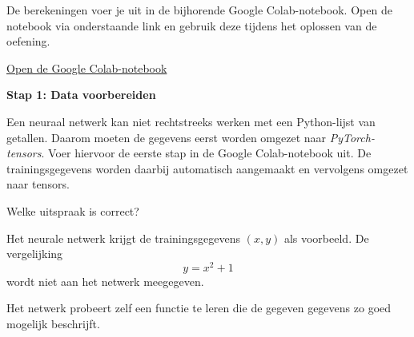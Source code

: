 \documentclass{ximera}
\begin{document}
De berekeningen voer je uit in de bijhorende Google Colab-notebook. Open de notebook via onderstaande link en gebruik deze tijdens het oplossen van de oefening.

\begin{center}
\href{https://colab.research.google.com/drive/17OMMkgFNeBZeORY04bA9OUqVQtMOB594?usp=sharing}{\Large Open de Google Colab-notebook}
\end{center}

\begin{question} \textbf{Stap 1: Data voorbereiden}

Een neuraal netwerk kan niet rechtstreeks werken met een Python-lijst van getallen. Daarom moeten de gegevens eerst worden omgezet naar \textit{PyTorch-tensors}. Voer hiervoor de eerste stap in de Google Colab-notebook uit. De trainingsgegevens worden daarbij automatisch aangemaakt en vervolgens omgezet naar tensors.

Welke uitspraak is correct?

\begin{multipleChoice}
\end{multipleChoice}

\begin{feedback} \text{ }

Het neurale netwerk krijgt de trainingsgegevens $(x,y)$ als voorbeeld.
De vergelijking
\[
y=x^2+1
\]
wordt niet aan het netwerk meegegeven.

Het netwerk probeert zelf een functie te leren die de gegeven gegevens zo goed mogelijk beschrijft.
\end{feedback}

\end{question}
\end{document}
